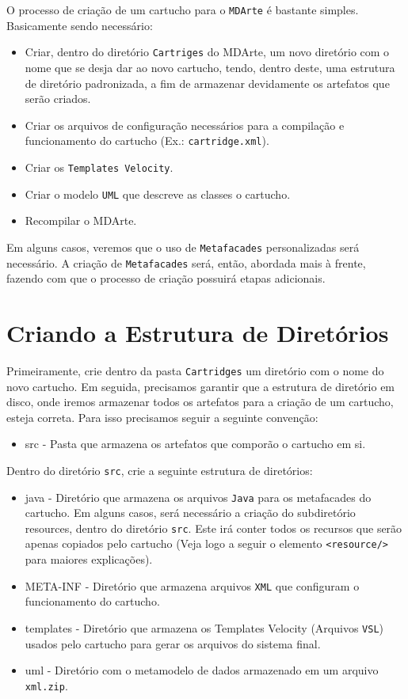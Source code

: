 O processo de criação de um cartucho para o \texttt{MDArte} é bastante simples.
Basicamente sendo necessário:
\begin{itemize}
\item Criar, dentro do diretório \texttt{Cartriges} do MDArte, um novo diretório
com o nome que se desja dar ao novo cartucho, tendo, dentro deste, uma estrutura
de diretório padronizada, a fim de armazenar devidamente os artefatos que serão
criados.
\item Criar os arquivos de configuração necessários para a compilação e
funcionamento do cartucho (Ex.: \texttt{cartridge.xml}).
\item Criar os \texttt{Templates Velocity}.
\item Criar o modelo \texttt{UML} que descreve as classes o
cartucho.
\item Recompilar o MDArte.
\end{itemize}

Em alguns casos, veremos que o uso de \texttt{Metafacades} personalizadas será
necessário. A criação de \texttt{Metafacades} será, então, abordada mais à
frente, fazendo com que o processo de criação possuirá etapas adicionais.

\section{Criando a Estrutura de Diretórios}
Primeiramente, crie dentro da pasta \texttt{Cartridges} um diretório com o nome
do novo cartucho. Em seguida, precisamos garantir que a estrutura
de diretório em disco, onde iremos armazenar todos os artefatos para a criação
de um cartucho, esteja correta. Para isso precisamos seguir a seguinte
convenção:

\begin{itemize}
  \item src - Pasta que armazena os artefatos que comporão o cartucho em si.
\end{itemize}

Dentro do diretório \texttt{src}, crie a seguinte estrutura de diretórios:

\begin{itemize}
  \item java - Diretório que armazena os arquivos \texttt{Java} para os
  metafacades do cartucho. Em alguns casos, será necessário a criação do
  subdiretório resources, dentro do diretório \texttt{src}. Este irá conter
  todos os recursos que serão apenas copiados pelo cartucho (Veja logo a seguir
  o elemento \texttt{<resource/>} para maiores explicações).
  \item META-INF - Diretório que armazena arquivos \texttt{XML} que configuram o
  funcionamento do cartucho.
  \item templates - Diretório que armazena os Templates Velocity (Arquivos
  \texttt{VSL}) usados pelo cartucho para gerar os arquivos do sistema final.
  \item uml - Diretório com o metamodelo de dados armazenado em um
	arquivo \texttt{xml.zip}.
\end{itemize}

